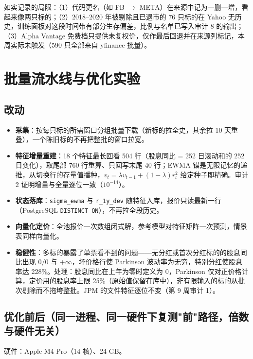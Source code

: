 \documentclass[11pt]{ctexart}
\begin{document}
如实记录的局限：（1）代码更名（如 FB $\to$ META）在来源中记为一删一增，看起来像两只标的；（2）2018--2020 年被剔除且已退市的 76 只标的在 Yahoo 无历史，训练面板对这段时间带有部分生存偏差，比例与名单已写入审计 8 的输出；（3）Alpha Vantage 免费档只提供未复权价，仅作最后回退并在来源列标记，本周实际未触发（590 只全部来自 yfinance 批量）。

\section{批量流水线与优化实验}

\subsection{改动}

\begin{itemize}
  \item \textbf{采集}：按每只标的所需窗口分组批量下载（新标的拉全史，其余拉 10 天重叠），一个陈旧标的不再把整批的窗口拉宽。
  \item \textbf{特征增量重建}：18 个特征最长回看 504 行（股息同比 = 252 日滚动和的 252 日变化），取尾部 760 行重算、只回写末尾 40 行；EWMA 锚是无限记忆的递推，从切换行的存量值播种，$v_t=\lambda v_{t-1}+(1-\lambda)r_t^2$ 给定种子即精确。审计 2 证明增量与全量逐位一致（$10^{-14}$）。
  \item \textbf{状态落库}：\texttt{sigma\_ewma} 与 \texttt{r\_1y\_dev} 随特征入库，报价只读最新一行（PostgreSQL \texttt{DISTINCT ON}），不再拉全段历史。
  \item \textbf{向量化定价}：全池报价一次数组闭式解，参考模型对特征矩阵一次预测，情景表同样向量化。
  \item \textbf{稳健性}：多标的暴露了单票看不到的问题——无分红或首次分红标的的股息同比出现 $0/0$ 与 $+\infty$，坏价格行使 Parkinson 波动率为无穷，特别分红使股息率达 228\%。处理：股息同比在上年为零时定义为 0，Parkinson 仅对正价格计算，定价用的股息率上限 25\%（原始值保留在库中），非有限输入的标的从批次剔除而不拖垮整批。JPM 的文件特征逐位不变（第 9 周审计 1）。
\end{itemize}

\subsection{优化前后（同一进程、同一硬件下复测"前"路径，倍数与硬件无关）}

硬件：Apple M4 Pro（14 核）、24 GB。
\end{document}
